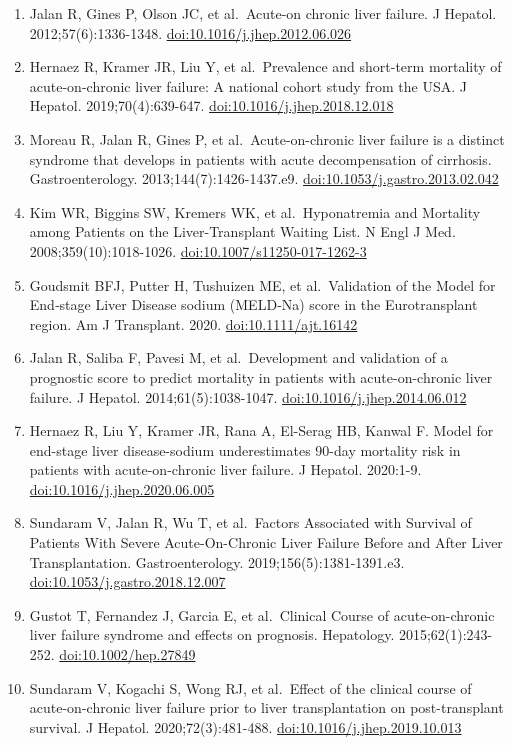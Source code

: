 \documentclass[11pt,english,]{book} %
\providecommand{\tightlist}{%
  \setlength{\itemsep}{0pt}\setlength{\parskip}{0pt}}
\begin{document}
\begin{enumerate}
\def\labelenumi{\arabic{enumi}.}
\tightlist
\item
  Jalan R, Gines P, Olson JC, et al.~Acute-on chronic liver failure. J Hepatol. 2012;57(6):1336-1348. \url{doi:10.1016/j.jhep.2012.06.026}
\item
  Hernaez R, Kramer JR, Liu Y, et al.~Prevalence and short-term mortality of acute-on-chronic liver failure: A national cohort study from the USA. J Hepatol. 2019;70(4):639-647. \url{doi:10.1016/j.jhep.2018.12.018}
\item
  Moreau R, Jalan R, Gines P, et al.~Acute-on-chronic liver failure is a distinct syndrome that develops in patients with acute decompensation of cirrhosis. Gastroenterology. 2013;144(7):1426-1437.e9. \url{doi:10.1053/j.gastro.2013.02.042}
\item
  Kim WR, Biggins SW, Kremers WK, et al.~Hyponatremia and Mortality among Patients on the Liver-Transplant Waiting List. N Engl J Med. 2008;359(10):1018-1026. \url{doi:10.1007/s11250-017-1262-3}
\item
  Goudsmit BFJ, Putter H, Tushuizen ME, et al.~Validation of the Model for End‐stage Liver Disease sodium (MELD‐Na) score in the Eurotransplant region. Am J Transplant. 2020. \url{doi:10.1111/ajt.16142}
\item
  Jalan R, Saliba F, Pavesi M, et al.~Development and validation of a prognostic score to predict mortality in patients with acute-on-chronic liver failure. J Hepatol. 2014;61(5):1038-1047. \url{doi:10.1016/j.jhep.2014.06.012}
\item
  Hernaez R, Liu Y, Kramer JR, Rana A, El-Serag HB, Kanwal F. Model for end-stage liver disease-sodium underestimates 90-day mortality risk in patients with acute-on-chronic liver failure. J Hepatol. 2020:1-9. \url{doi:10.1016/j.jhep.2020.06.005}
\item
  Sundaram V, Jalan R, Wu T, et al.~Factors Associated with Survival of Patients With Severe Acute-On-Chronic Liver Failure Before and After Liver Transplantation. Gastroenterology. 2019;156(5):1381-1391.e3. \url{doi:10.1053/j.gastro.2018.12.007}
\item
  Gustot T, Fernandez J, Garcia E, et al.~Clinical Course of acute-on-chronic liver failure syndrome and effects on prognosis. Hepatology. 2015;62(1):243-252. \url{doi:10.1002/hep.27849}
\item
  Sundaram V, Kogachi S, Wong RJ, et al.~Effect of the clinical course of acute-on-chronic liver failure prior to liver transplantation on post-transplant survival. J Hepatol. 2020;72(3):481-488. \url{doi:10.1016/j.jhep.2019.10.013}

\end{enumerate}
\end{document}
